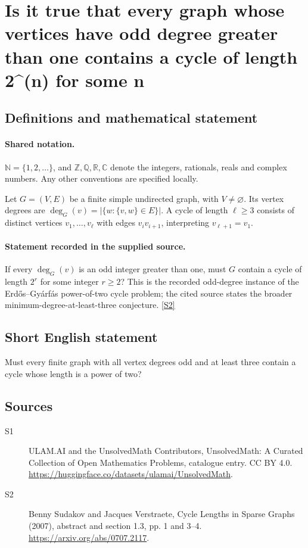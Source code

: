 \documentclass[11pt]{article}
\newcommand{\sref}[2]{\hyperlink{source:#1:#2}{[S#2]}}
\begin{document}
\section{Is it true that every graph whose vertices have odd degree greater than one contains a cycle of length 2\textasciicircum{}(n) for some n}\label{statement}

\subsection{Definitions and mathematical statement}

\paragraph{Shared notation.}$\mathbb N=\{1,2,\ldots\}$, and $\mathbb Z,\mathbb Q,\mathbb R,\mathbb C$ denote the integers, rationals, reals and complex numbers. Any other conventions are specified locally.


Let $G=(V,E)$ be a finite simple undirected graph, with $V\ne\varnothing$. Its vertex degrees are $\deg_G(v)=|\{w:\{v,w\}\in E\}|$. A cycle of length $\ell\geq3$ consists of distinct vertices $v_1,\ldots,v_\ell$ with edges $v_iv_{i+1}$, interpreting $v_{\ell+1}=v_1$.
\paragraph{Statement recorded in the supplied source.}
If every $\deg_G(v)$ is an odd integer greater than one, must $G$ contain a cycle of length $2^r$ for some integer $r\geq2$? This is the recorded odd-degree instance of the Erd\H{o}s--Gy\'arf\'as power-of-two cycle problem; the cited source states the broader minimum-degree-at-least-three conjecture. \sref{statement}{2}
\subsection{Short English statement}
Must every finite graph with all vertex degrees odd and at least three contain a cycle whose length is a power of two?
\subsection{Sources}
\begin{description}
\item[\hypertarget{source:statement:1}{S1}] ULAM.AI and the UnsolvedMath Contributors, UnsolvedMath: A Curated Collection of Open Mathematics Problems, catalogue entry. CC BY 4.0. \url{https://huggingface.co/datasets/ulamai/UnsolvedMath}.
\item[\hypertarget{source:statement:2}{S2}] Benny Sudakov and Jacques Verstraete, Cycle Lengths in Sparse Graphs (2007), abstract and section 1.3, pp. 1 and 3--4. \url{https://arxiv.org/abs/0707.2117}.
\end{description}
\label{end:statement}
\end{document}
